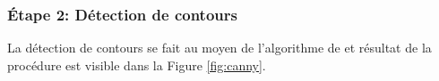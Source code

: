 \subsubsection{Étape 2: Détection de contours} 
La détection de contours se fait au moyen de l'algorithme de \citep{Canny1986} et résultat de la procédure est visible dans la Figure \ref{fig:canny}.

% 
